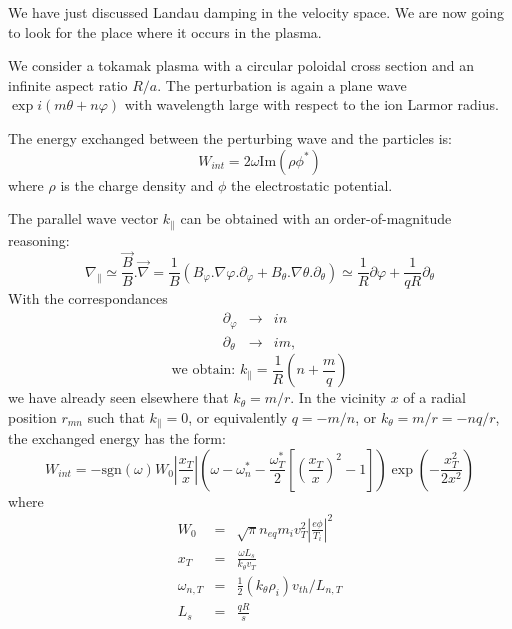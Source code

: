 We have just discussed Landau damping in the velocity space. We are now going to look for the place where it occurs in the plasma.

We consider a tokamak plasma with a circular poloidal cross section and an infinite aspect ratio $R/a$.
The perturbation is again a plane wave $\exp i(m\theta + n\varphi)$ with wavelength large with respect to the ion Larmor radius.

The energy exchanged between the perturbing wave and the particles is:
\[
		W_{int} = 2\omega \mbox{Im}(\rho\phi^*)
\]
where $\rho$ is the charge density and $\phi$ the electrostatic potential.

The parallel wave vector $k_\|$ can be obtained with an order-of-magnitude reasoning:
\[
		\nabla_\| \simeq \frac{\vec{B}}{B}.\vec{\nabla} = \frac{1}{B}\left( B_\varphi. \nabla\varphi.\partial_\varphi + B_\theta.\nabla\theta.\partial_\theta \right) \simeq \frac{1}{R}\partial\varphi + \frac{1}{qR}\partial_\theta
\]
With the correspondances
\begin{eqnarray*}
		\partial_\varphi  &  \rightarrow	&  in	\\
		\partial_\theta   &  \rightarrow	&  im,	
\end{eqnarray*}
\[
\mbox{we obtain: } k_\| = \frac{1}{R}\left( n + \frac{m}{q} \right)
\]	
we have already seen elsewhere that $k_\theta = m/r$. In the vicinity $x$ of a radial position $r_{mn}$ such that $k_\| = 0$, or equivalently $q = - m/n$, or $k_\theta = m/r = -nq/r$, the exchanged energy has the form:
\[
		W_{int} = -\mbox{sgn}(\omega) W_0 \left| \frac{x_T}{x} \right| \left( \omega-\omega^*_n -\frac{\omega_T^*}{2} \left[ \left( \frac{x_T}{x} \right)^2 - 1 \right] \right)  \exp \left( - \frac{x_T^2}{2x^2} \right)
\]
where
\begin{eqnarray*}
		W_0  &  =  &  \sqrt{\pi} n_{eq} m_i v_T^2 \left| \frac{e\phi}{T_i} \right|^2		\\
		x_T  &  =  &  \frac{\omega L_s}{k_\theta v_T}			\\
		\omega_{n,T}  &  =  &  \frac{1}{2} \left( k_\theta \rho_i \right) v_{th} / L_{n,T}		\\
		L_s  &  =  &  \frac{qR}{s}
\end{eqnarray*}

